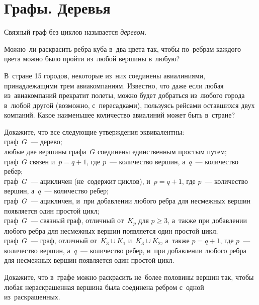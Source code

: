
\section*{Графы. Деревья}


Связный граф без циклов называется \emph{деревом}.

\begin{problems}

\item
Можно~ли раскрасить ребра куба в~два цвета так, чтобы по~ребрам каждого цвета
можно было пройти из~любой вершины в~любую?

\item
В~стране 15 городов, некоторые из~них соединены авиалиниями, принадлежащими
трем авиакомпаниям.
Известно, что даже если любая из~авиакомпаний прекратит полеты, можно будет
добраться из~любого города в~любой другой (возможно, с~пересадками), пользуясь
рейсами оставшихся двух компаний.
Какое наименьшее количество авиалиний может быть в~стране?

\item
Докажите, что все следующие утверждения эквивалентны:
\\
граф~$G$~--- дерево;
\\
любые две вершины графа~$G$ соединены единственным простым путем;
\\
граф~$G$ связен и~$p = q + 1$, где $p$~--- количество вершин, а~$q$~---
количество ребер;
\\
граф~$G$~--- ацикличен (не~содержит циклов), и~$p = q + 1$, где $p$~---
количество вершин, а~$q$~--- количество ребер;
\\
граф~$G$~--- ацикличен, и~при добавлении любого ребра для несмежных вершин
появляется один простой цикл;
\\
граф~$G$~--- связный граф, отличный от~$K_p$ для $p \geq 3$, а~также при
добавлении любого ребра для несмежных вершин появляется один простой цикл;
\\
граф~$G$~--- граф, отличный от~$K_3 \cup K_1$ и~$K_3 \cup K_2$,
а~также $p = q + 1$, где $p$~--- количество вершин, а~$q$~--- количество ребер,
и~при добавлении любого ребра для несмежных вершин появляется один простой
цикл.

\item
Докажите, что в~графе можно раскрасить не~более половины вершин так, чтобы
любая нераскрашенная вершина была соединена ребром с~одной из~раскрашенных.


\end{problems}
